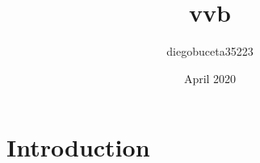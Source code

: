 \documentclass{article}
\title{vvb}
\author{diegobuceta35223 }
\date{April 2020}
\begin{document}
\maketitle

\section{Introduction}
\end{document}
